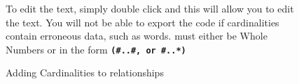 \documentclass[a4paper]{article}
\begin{document}
\begin{figure}[H]
\begin{center}
\end{center}
To edit the text, simply double click and this will allow you to edit the text. You will not be able to export the code if cardinalities contain erroneous data, such as words. must either be Whole Numbers or in the form \texttt{\textbf{(\#..\#, or \#..*)}}
\begin{center}
\caption{Adding Cardinalities to relationships}
\end{center}
\end{figure}

\newpage

\listoffigures
\printindex
\end{document}
